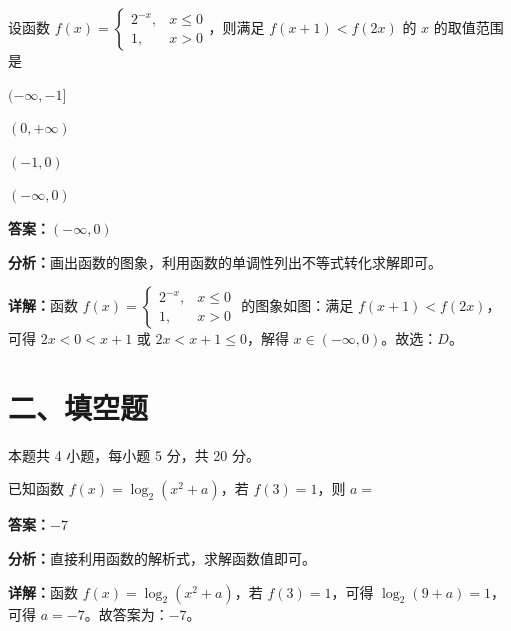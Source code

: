 \begin{question}[points=5]
设函数 $f(x)=\begin{cases} 2^{-x}, & x\le 0 \\ 1, & x>0 \end{cases}$，则满足 $f(x+1)<f(2x)$ 的 $x$ 的取值范围是
\begin{choices}
  \item $(-\infty,-1]$
  \item $(0,+\infty)$
  \item $(-1,0)$
  \item $(-\infty,0)$
\end{choices}
\begin{solution}
\textbf{答案：}$(-\infty,0)$

\textbf{分析：}画出函数的图象，利用函数的单调性列出不等式转化求解即可。

\textbf{详解：}函数 $f(x)=\begin{cases} 2^{-x}, & x\le 0 \\ 1, & x>0 \end{cases}$ 的图象如图：满足 $f(x+1)<f(2x)$，可得 $2x<0<x+1$ 或 $2x<x+1\le 0$，解得 $x\in(-\infty,0)$。故选：$D$。
\end{solution}
\end{question}

\section*{二、填空题}
本题共 4 小题，每小题 5 分，共 20 分。

\begin{question}[points=5]
已知函数 $f(x)=\log_2(x^2+a)$，若 $f(3)=1$，则 $a=$
\fillin[{$-7$}]
\begin{solution}
\textbf{答案：}$-7$

\textbf{分析：}直接利用函数的解析式，求解函数值即可。

\textbf{详解：}函数 $f(x)=\log_2(x^2+a)$，若 $f(3)=1$，可得 $\log_2(9+a)=1$，可得 $a=-7$。故答案为：$-7$。
\end{solution}
\end{question}

